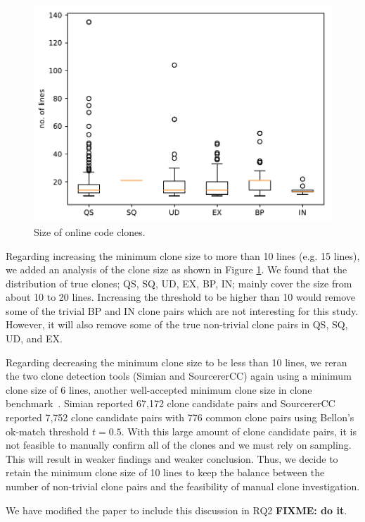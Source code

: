 \documentclass[a4paper,twoside,10pt]{reviewresponse}
\newcommand\FIXME[1]{{\color{red}\textbf{FIXME: #1}}}
\begin{document}
\begin{figure}[H]
	\centering
	\includegraphics[width=0.5\linewidth]{../boxplot_clone_size}
	\caption{Size of online code clones.}
	\label{fig:boxplotclonesize}
\end{figure}

Regarding increasing the minimum clone size to more than 10 lines (e.g. 15 lines), we added an analysis of the clone size as shown in Figure \ref{fig:boxplotclonesize}. We found that the distribution of true clones; QS, SQ, UD, EX, BP, IN; mainly cover the size from about 10 to 20 lines. Increasing the threshold to be higher than 10 would remove some of the trivial BP and IN clone pairs which are not interesting for this study. However, it will also remove some of the true non-trivial clone pairs in QS, SQ, UD, and EX.

Regarding decreasing the minimum clone size to be less than 10 lines, we reran the two clone detection tools (Simian and SourcererCC) again using a minimum clone size of 6 lines, another well-accepted minimum clone size in clone benchmark~\citep{Bellon2007}. Simian reported 67,172 clone candidate pairs and SourcererCC reported 7,752 clone candidate pairs with 776 common clone pairs using Bellon's ok-match threshold $t=0.5$. With this large amount of clone candidate pairs, it is not feasible to manually confirm all of the clones and we must rely on sampling. This will result in weaker findings and weaker conclusion. Thus, we decide to retain the minimum clone size of 10 lines to keep the balance between the number of non-trivial clone pairs and the feasibility of manual clone investigation.

We have modified the paper to include this discussion in RQ2 \FIXME{do it}.

\end{document}

